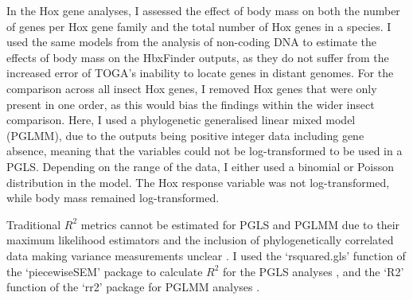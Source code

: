 \documentclass[11pt]{article}
\begin{document}
In the Hox gene analyses, I assessed the effect of body mass on both the number of genes per Hox gene family and the total number of Hox genes in a species. I used the same models from the analysis of non-coding DNA to estimate the effects of body mass on the HbxFinder outputs, as they do not suffer from the increased error of TOGA's inability to locate genes in distant genomes. For the comparison across all insect Hox genes, I removed Hox genes that were only present in one order, as this would bias the findings within the wider insect comparison. Here, I used a phylogenetic generalised linear mixed model (PGLMM), due to the outputs being positive integer data including gene absence, meaning that the variables could not be log-transformed to be used in a PGLS. Depending on the range of the data, I either used a binomial or Poisson distribution in the model. The Hox response variable was not log-transformed, while body mass remained log-transformed. 

Traditional $R^2$ metrics cannot be estimated for PGLS and PGLMM due to their maximum likelihood estimators and the inclusion of phylogenetically correlated data making variance measurements unclear \citep{rr2}.  I used the `rsquared.gls' function of the `piecewiseSEM' package to calculate $R^2$ for the PGLS analyses \citep{piecewiseSEM}, and the `R2' function of the `rr2' package for PGLMM analyses \citep{rr2}.
\end{document}
